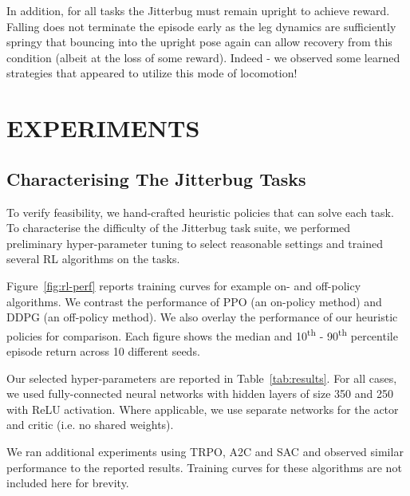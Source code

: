 \documentclass[letterpaper, 10 pt, conference]{ieeeconf}
\begin{document}
In addition, for all tasks the Jitterbug must remain upright to achieve reward.
Falling does not terminate the episode early as the leg dynamics are sufficiently springy that bouncing into the upright pose again can allow recovery from this condition (albeit at the loss of some reward).
Indeed - we observed some learned strategies that appeared to utilize this mode of locomotion!

\section{EXPERIMENTS}

\subsection{Characterising The Jitterbug Tasks}

To verify feasibility, we hand-crafted heuristic policies that can solve each task.
To characterise the difficulty of the Jitterbug task suite, we performed preliminary hyper-parameter tuning to select reasonable settings and trained several RL algorithms on the tasks.

Figure~\ref{fig:rl-perf} reports training curves for example on- and off-policy algorithms.
We contrast the performance of PPO (an on-policy method) and DDPG (an off-policy method).
We also overlay the performance of our heuristic policies for comparison.
Each figure shows the median and 10\textsuperscript{th} - 90\textsuperscript{th} percentile episode return across 10 different seeds.

Our selected hyper-parameters are reported in Table~\ref{tab:results}.
For all cases, we used fully-connected neural networks with hidden layers of size 350 and 250 with ReLU activation.
Where applicable, we use separate networks for the actor and critic (i.e. no shared weights).

We ran additional experiments using TRPO, A2C and SAC and observed similar performance to the reported results.
Training curves for these algorithms are not included here for brevity.
\end{document}
